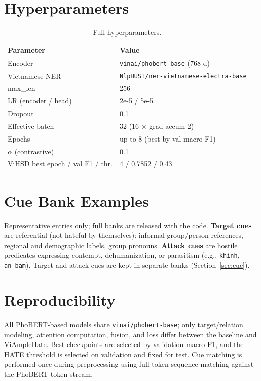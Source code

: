 \documentclass[11pt]{article}
\begin{document}
\section{Hyperparameters}
\label{sec:hparams}
\begin{table}[h]
  \centering
  \small
  \begin{tabular}{ll}
    \toprule
    \textbf{Parameter} & \textbf{Value} \\
    \midrule
    Encoder & \texttt{vinai/phobert-base} (768-d) \\
    Vietnamese NER & \texttt{NlpHUST/ner-vietnamese-electra-base} \\
    max\_len & 256 \\
    LR (encoder / head) & 2e-5 / 5e-5 \\
    Dropout & 0.1 \\
    Effective batch & 32 (16 $\times$ grad-accum 2) \\
    Epochs & up to 8 (best by val macro-F1) \\
    $\alpha$ (contrastive) & 0.1 \\
    ViHSD best epoch / val F1 / thr. & 4 / 0.7852 / 0.43 \\
    \bottomrule
  \end{tabular}
  \caption{Full hyperparameters.}
  \label{tab:hparams}
\end{table}

\section{Cue Bank Examples}
\label{sec:cuebank}
Representative entries only; full banks are released with the code. \textbf{Target cues} are referential (not hateful by themselves): informal group/person references, regional and demographic labels, group pronouns. \textbf{Attack cues} are hostile predicates expressing contempt, dehumanization, or parasitism (e.g., \texttt{khinh}, \texttt{an\_bam}). Target and attack cues are kept in separate banks (Section~\ref{sec:cue}).

\section{Reproducibility}
\label{sec:repro}
All PhoBERT-based models share \texttt{vinai/phobert-base}; only target/relation modeling, attention computation, fusion, and loss differ between the baseline and ViAmpleHate. Best checkpoints are selected by validation macro-F1, and the HATE threshold is selected on validation and fixed for test. Cue matching is performed once during preprocessing using full token-sequence matching against the PhoBERT token stream.
\end{document}
